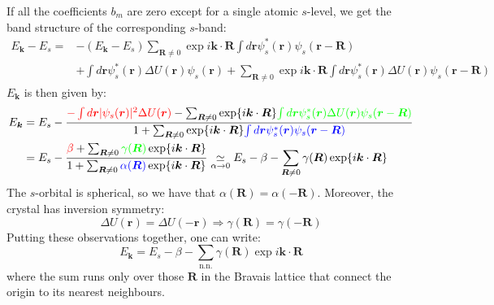 \documentclass[10.75pt,a4paper,openright,bottom=2cm]{article}
\renewcommand{\Vec}[1]{\boldsymbol{#1}}
\begin{document}
If all the coefficients $b_m$ are zero except for a single atomic $s$-level, we get the band structure of the corresponding $s$-band:
\begin{align*}
E_{\Vec{k}}-E_s=&-(E_{\Vec{k}}-E_s)\sum_{\Vec{R}\neq0}\exp{i\Vec{k}\cdot\Vec{R}}\int d\Vec{r}\psi_s^*(\Vec{r})\psi_s(\Vec{r}-\Vec{R})\\
&+\int d\Vec{r}\psi_s^*(\Vec{r})\Delta U(\Vec{r})\psi_s(\Vec{r})+\sum_{\Vec{R}\neq0}\exp{i\Vec{k}\cdot\Vec{R}}\int d\Vec{r}\psi_s^*(\Vec{r})\Delta U(\Vec{r})\psi_s(\Vec{r}-\Vec{R})
\end{align*}
$E_{\Vec{k}}$ is then given by:
\begin{align*}
E_{\Vec{k}}&=E_s-\frac{{\color{red}{-\int d\Vec{r}|\psi_s(\Vec{r})|^2\Delta U(\Vec{r})}}-\sum_{\Vec{R}\neq0}\exp{i\Vec{k}\cdot\Vec{R}}{\color{green}{\int d\Vec{r}\psi_s^*(\Vec{r})\Delta U(\Vec{r})\psi_s(\Vec{r}-\Vec{R})}}}{1+\sum_{\Vec{R}\neq0}\exp{i\Vec{k}\cdot\Vec{R}}{\color{blue}{\int d\Vec{r}\psi_s^*(\Vec{r})\psi_s(\Vec{r}-\Vec{R})}}}\\
&=E_s-\frac{{\color{red}{\beta}}+\sum_{\Vec{R}\neq0}{\color{green}{\gamma(\Vec{R})}}\exp{i\Vec{k}\cdot\Vec{R}}}{1+\sum_{\Vec{R}\neq0}{\color{blue}{\alpha(\Vec{R})}}\exp{i\Vec{k}\cdot\Vec{R}}}\underset{\alpha\to0}{\simeq}E_s-\beta-\sum_{\Vec{R}\neq0}\gamma(\Vec{R})\exp{i\Vec{k}\cdot\Vec{R}}
\end{align*}
The $s$-orbital is spherical, so we have that $\alpha(\Vec{R})=\alpha(-\Vec{R})$. Moreover, the crystal has inversion symmetry:
\[
\Delta U(\Vec{r})=\Delta U(-\Vec{r})\Rightarrow\gamma(\Vec{R})=\gamma(-\Vec{R})
\]
Putting these observations together, one can write:
\[
E_{\Vec{k}}=E_s-\beta-\sum_{\text{n.n.}}\gamma(\Vec{R})\exp{i\Vec{k}\cdot\Vec{R}}
\]
where the sum runs only over those $\Vec{R}$ in the Bravais lattice that connect the origin to its nearest neighbours.
\end{document}
